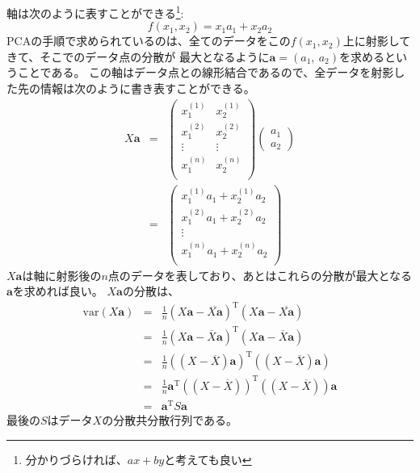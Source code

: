 軸は次のように表すことができる\footnote{分かりづらければ、$ax+by$と考えても良い}:
\begin{equation}
  f(x_1, x_2) = x_1a_1 + x_2a_2
\end{equation}
PCAの手順で求められているのは、全てのデータをこの$f(x_1, x_2)$上に射影してきて、そこでのデータ点の分散が
最大となるように$\bm{a}=(a_1,~a_2)$を求めるということである。
この軸はデータ点との線形結合であるので、全データを射影した先の情報は次のように書き表すことができる。
\begin{eqnarray}
  X\bm{a} &=&
    \left(
  \begin{array}{cc}
    x_1^{(1)} & x_2^{(1)} \\
    x_1^{(2)} & x_2^{(2)} \\
    \vdots    & \vdots    \\
    x_1^{(n)} & x_2^{(n)} \\
  \end{array}
  \right)
    \left(
  \begin{array}{c}
    a_1 \\
    a_2 
  \end{array}
  \right) \\
  &=&
  \left(
  \begin{array}{c}
    x_1^{(1)}a_1 + x_2^{(1)}a_2 \\
    x_1^{(2)}a_1 + x_2^{(2)}a_2 \\
    \vdots      \\
    x_1^{(n)}a_1 + x_2^{(n)}a_2 \\
  \end{array}
  \right)
\end{eqnarray}
$X\bm{a}$は軸に射影後の$n$点のデータを表しており、あとはこれらの分散が最大となる$\bm{a}$を求めれば良い。
$X\bm{a}$の分散は、
\begin{eqnarray}
  \mathrm{var}(X\bm{a}) &=& \frac{1}{n} \left(X\bm{a} -\overline{X\bm{a}} \right)^\mathrm{T} \left(X\bm{a}-\overline{X\bm{a}} \right) \\
  &=& \frac{1}{n} \left(X\bm{a} -\overline{X}\bm{a} \right)^\mathrm{T} \left(X\bm{a}-\overline{X}\bm{a} \right) \\
  &=& \frac{1}{n} \left((X -\overline{X})\bm{a} \right)^\mathrm{T} \left((X-\overline{X})\bm{a} \right) \\
  &=& \frac{1}{n} \bm{a}^\mathrm{T}\left((X -\overline{X}) \right)^\mathrm{T} \left((X-\overline{X})\right)\bm{a}  \\
  &=& \bm{a}^\mathrm{T} S \bm{a}  
\end{eqnarray}
最後の$S$はデータ$X$の分散共分散行列である。
